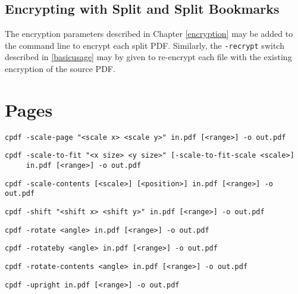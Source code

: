 \documentclass{book}
\begin{document}
\section{Encrypting with Split and Split Bookmarks}

The encryption parameters described in Chapter \ref{encryption} may be added to the command line to encrypt each split PDF. Similarly, the \texttt{-recrypt} switch described in \ref{basicusage} may by given to re-encrypt each file with the existing encryption of the source PDF. 


\chapter{Pages}
  \label{pages}
  \begin{framed}
  \small\noindent\verb!cpdf -scale-page "<scale x> <scale y>" in.pdf [<range>] -o out.pdf!
   
  \vspace{1.5mm}
  \small\noindent\verb!cpdf -scale-to-fit "<x size> <y size>" [-scale-to-fit-scale <scale>]!\\    
        \noindent\verb!     in.pdf [<range>] -o out.pdf!


  \vspace{1.5mm}
  \small\noindent\verb!cpdf -scale-contents [<scale>] [<position>] in.pdf [<range>] -o out.pdf!
  
  \vspace{1.5mm}
  \small\noindent\verb!cpdf -shift "<shift x> <shift y>" in.pdf [<range>] -o out.pdf!

  \vspace{1.5mm}
  \small\noindent\verb!cpdf -rotate <angle> in.pdf [<range>] -o out.pdf!

  \vspace{1.5mm}
  \small\noindent\verb!cpdf -rotateby <angle> in.pdf [<range>] -o out.pdf!

  \vspace{1.5mm}
  \small\noindent\verb!cpdf -rotate-contents <angle> in.pdf [<range>] -o out.pdf!

  \vspace{1.5mm}
  \small\noindent\verb!cpdf -upright in.pdf [<range>] -o out.pdf!


\end{framed}
\end{document}
